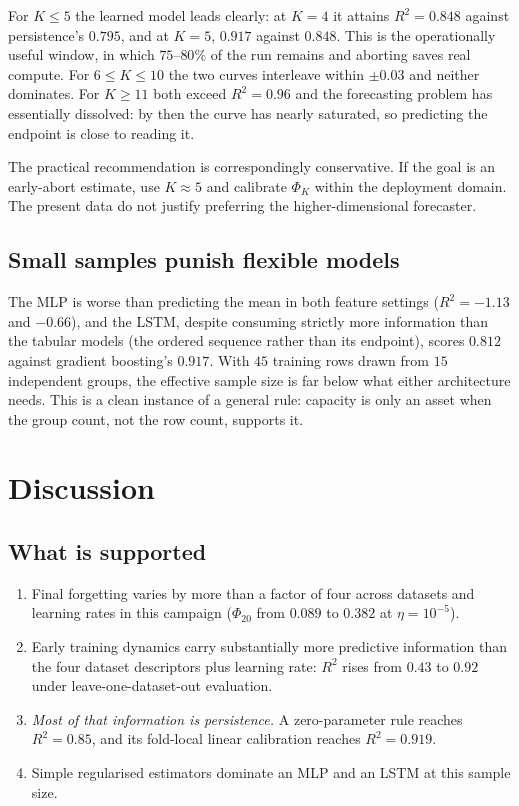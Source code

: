 \documentclass[manuscript,nonacm]{acmart}
\begin{document}
For $K\le5$ the learned model leads clearly: at $K=4$ it attains $R^2=0.848$ against
persistence's $0.795$, and at $K=5$, $0.917$ against $0.848$. This is the operationally
useful window, in which $75$--$80\%$ of the run remains and aborting saves real compute.
For $6\le K\le10$ the two curves interleave within $\pm0.03$ and neither dominates. For
$K\ge11$ both exceed $R^2=0.96$ and the forecasting problem has essentially dissolved:
by then the curve has nearly saturated, so predicting the endpoint is close to reading it.

The practical recommendation is correspondingly conservative. If the goal is an
early-abort estimate, use $K\approx5$ and calibrate $\Phi_K$ within the deployment
domain. The present data do not justify preferring the higher-dimensional forecaster.

\subsection{Small samples punish flexible models}
The MLP is worse than predicting the mean in both feature settings
($R^2=-1.13$ and $-0.66$), and the LSTM, despite consuming strictly more information
than the tabular models (the ordered sequence rather than its endpoint), scores $0.812$
against gradient boosting's $0.917$. With $45$ training rows drawn from $15$ independent
groups, the effective sample size is far below what either architecture needs. This is a
clean instance of a general rule: capacity is only an asset when the group count, not the
row count, supports it.

\section{Discussion}

\subsection{What is supported}
\begin{enumerate}
\item Final forgetting varies by more than a factor of four across datasets and learning
      rates in this campaign ($\Phi_{20}$ from $0.089$ to $0.382$ at $\eta=10^{-5}$).
\item Early training dynamics carry substantially more predictive information than the
      four dataset descriptors plus learning rate: $R^2$ rises from $0.43$ to $0.92$
      under leave-one-dataset-out evaluation.
\item \emph{Most of that information is persistence.} A zero-parameter rule reaches
      $R^2=0.85$, and its fold-local linear calibration reaches $R^2=0.919$.
\item Simple regularised estimators dominate an MLP and an LSTM at this sample size.
\end{enumerate}
\end{document}
